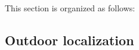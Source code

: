     This section is organized as follows: 

    \subsection{Outdoor localization}

  \begin{comment}
    Organization:
      - Localization and mapping: Talk about Localization techniques:
        - Outdoor: GPS
        - Indoor: Bluetooth/WiFi Beacons, OptiTrack camera, Image-Based algorithms
  \end{comment}

  \begin{comment}
    \begin{itemize}
    \end{itemize}
  \end{comment}
